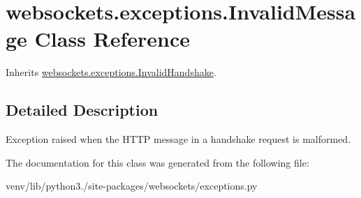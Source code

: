 \hypertarget{classwebsockets_1_1exceptions_1_1_invalid_message}{}\section{websockets.\+exceptions.\+Invalid\+Message Class Reference}
\label{classwebsockets_1_1exceptions_1_1_invalid_message}


Inherits \hyperlink{classwebsockets_1_1exceptions_1_1_invalid_handshake}{websockets.\+exceptions.\+Invalid\+Handshake}.



\subsection{Detailed Description}
\begin{DoxyVerb}Exception raised when the HTTP message in a handshake request is malformed.\end{DoxyVerb}
 

The documentation for this class was generated from the following file\+:\begin{DoxyCompactItemize}
\item 
venv/lib/python3./site-\/packages/websockets/exceptions.\+py\end{DoxyCompactItemize}
